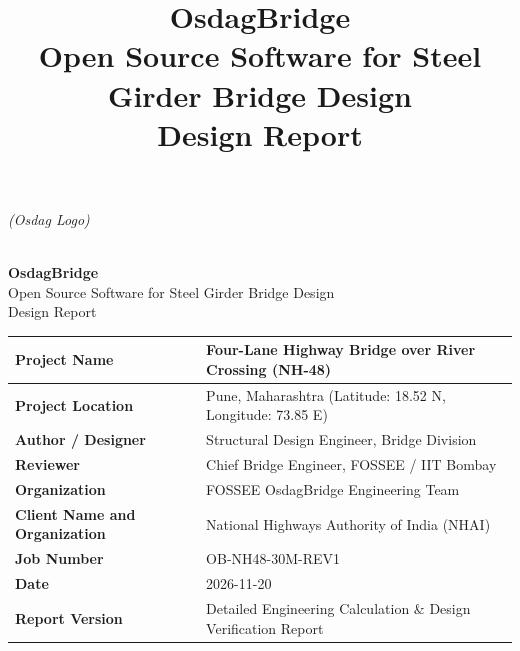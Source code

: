 \documentclass[12pt,a4paper]{report}
\title{\Large\textbf{OsdagBridge} \\ \normalsize Open Source Software for Steel Girder Bridge Design \\ \vspace{2cm} \large Design Report}
\author{}
\date{}
\numberwithin{table}{chapter}
\numberwithin{figure}{chapter}
\begin{document}
\begin{titlepage}
\thispagestyle{firstpage}
\centering
\vspace*{1.5cm}
\noindent
\begin{minipage}[c]{0.6\textwidth}
\raggedright
\textit{(Osdag Logo)}
\end{minipage}%
\hfill
\begin{minipage}[c]{0.35\textwidth}
\raggedleft

\end{minipage}
\\[1cm]

{\Huge \textbf{OsdagBridge}}\\[0.3cm]
{\large Open Source Software for Steel Girder Bridge Design}\\[1.5cm]
{\Large Design Report}\\[1.5cm]
\begin{tabular}{|L{4cm}|L{10cm}|}
\hline
\textbf{Project Name} & Four-Lane Highway Bridge over River Crossing (NH-48) \\
\hline
\textbf{Project Location} & Pune, Maharashtra (Latitude:\allowbreak{} 18.52 N, Longitude:\allowbreak{} 73.85 E) \\
\hline
\textbf{Author / Designer} & Structural Design Engineer, Bridge Division \\
\hline
\textbf{Reviewer} & Chief Bridge Engineer, FOSSEE / IIT Bombay \\
\hline
\textbf{Organization} & FOSSEE OsdagBridge Engineering Team \\
\hline
\textbf{Client Name and Organization} & National Highways Authority of India (NHAI) \\
\hline
\textbf{Job Number} & OB-NH48-30M-REV1 \\
\hline
\textbf{Date} & 2026-11-20 \\
\hline
\textbf{Report Version} & Detailed Engineering Calculation \& Design Verification Report \\
\hline
\end{tabular}
\end{titlepage}


\titleformat{\chapter}[block]
  {\normalfont\Large\bfseries\centering}{\thechapter}{1em}{}
\titlespacing*{\chapter}{0pt}{0pt}{10pt}
\setcounter{tocdepth}{2}
\end{document}
